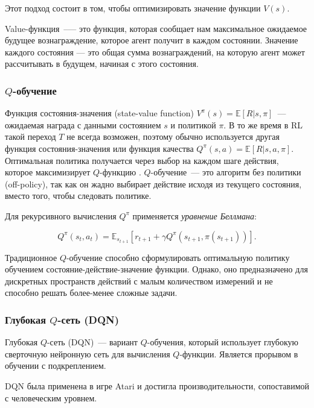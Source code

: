 Этот подход состоит в том, чтобы оптимизировать значение функции $V(s)$.

Value-функция~--— это функция, которая сообщает нам максимальное ожидаемое будущее вознаграждение, которое агент получит в каждом состоянии. Значение каждого состояния — это общая сумма вознаграждений, на которую агент может рассчитывать в будущем, начиная с этого состояния.

\subsubsection{$Q$-обучение}

Функция состояния-значения (state-value function) $V^\pi (s) = \mathbb{E}[R|s, \pi]$~--- ожидаемая награда с данными состоянием $s$ и политикой $\pi$. В то же время в RL такой переход $T$ не всегда возможен, поэтому обычно используется другая функция состояния-значения или функция качества ${Q^\pi(s,a) = \mathbb{E}[R|s, a, \pi]}$. Оптимальная политика получается через выбор на каждом шаге действия, которое максимизирует $Q$-функцию \cite{SuttonAndBarto-RL-Introduction-p107}. $Q$-обучение~--- это алгоритм без политики (off-policy), так как он жадно выбирает действие исходя из текущего состояния, вместо того, чтобы следовать политике.

Для рекурсивного вычисления $Q^\pi$ применяется {\itshape уравнение Беллмана}:

\begin{equation}
    \label{eq:q-learning-bellmanEq}
    Q^\pi(s_t, a_t) = \mathbb{E}_{s_{t+1}}[r_{t+1} + \gamma Q^\pi (s_{t+1}, \pi(s_{t+1}))].
\end{equation}

Традиционное $Q$-обучение способно сформулировать оптимальную политику обучением состояние-действие-значение функции. Однако, оно предназначено для дискретных пространств действий с малым количеством измерений и не способно решать более-менее сложные задачи.

\subsubsection{Глубокая $Q$-сеть (DQN)}

Глубокая $Q$-сеть (DQN)~--- вариант $Q$-обучения, который использует глубокую сверточную нейронную сеть для вычисления $Q$-функции. Является прорывом в обучении с подкреплением. \cite{bertsekas1996neuro}

DQN была применена в игре Atari и достигла производительности, сопоставимой с человеческим уровнем. \cite{Mnih2015}

